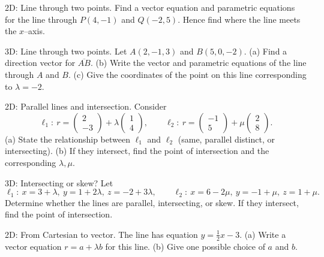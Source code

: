 \documentclass[11pt]{article}
\def\textbf#1{#1}%
\def\mathbf#1{#1}%
\newcounter{question}
\begin{document}
\begin{question}
\textbf{2D: Line through two points.}
Find a vector equation and parametric equations for the line through $P(4,-1)$ and $Q(-2,5)$. Hence find where the line meets the $x$–axis.
\end{question}

\begin{question}
\textbf{3D: Line through two points.}
Let $A(2,-1,3)$ and $B(5,0,-2)$.  
(a) Find a direction vector for $\overline{AB}$.  
(b) Write the vector and parametric equations of the line through $A$ and $B$.  
(c) Give the coordinates of the point on this line corresponding to $\lambda=-2$.
\end{question}

\begin{question}
\textbf{2D: Parallel lines and intersection.}
Consider
\[
\ell_1:\ \mathbf{r}=\begin{pmatrix}2\\-3\end{pmatrix}+\lambda\begin{pmatrix}1\\4\end{pmatrix},
\qquad
\ell_2:\ \mathbf{r}=\begin{pmatrix}-1\\5\end{pmatrix}+\mu\begin{pmatrix}2\\8\end{pmatrix}.
\]
(a) State the relationship between $\ell_1$ and $\ell_2$ (same, parallel distinct, or intersecting).  
(b) If they intersect, find the point of intersection and the corresponding $\lambda,\mu$.
\end{question}

\begin{question}
\textbf{3D: Intersecting or skew?}
Let
\[
\ell_1:\ x=3+\lambda,\ y=1+2\lambda,\ z=-2+3\lambda,\qquad
\ell_2:\ x=6-2\mu,\ y=-1+\mu,\ z=1+\mu.
\]
Determine whether the lines are parallel, intersecting, or skew. If they intersect, find the point of intersection.
\end{question}

\begin{question}
\textbf{2D: From Cartesian to vector.}
The line has equation $y=\tfrac{1}{2}x-3$.  
(a) Write a vector equation $\mathbf{r}=\mathbf{a}+\lambda\mathbf{b}$ for this line.  
(b) Give one possible choice of $\mathbf{a}$ and $\mathbf{b}$.
\end{question}
\end{document}
